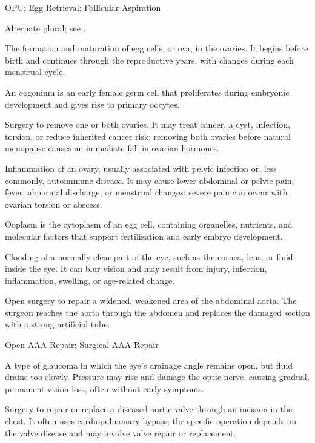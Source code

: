\synonyms
OPU; Egg Retrieval; Follicular Aspiration

 Alternate plural; see .

 The formation and maturation of egg cells, or ova, in the ovaries. It begins before birth and continues through the reproductive years, with changes during each menstrual cycle.

 An oogonium is an early female germ cell that proliferates during embryonic development and gives rise to primary oocytes.

 Surgery to remove one or both ovaries. It may treat cancer, a cyst, infection, torsion, or reduce inherited cancer risk; removing both ovaries before natural menopause causes an immediate fall in ovarian hormones.

 Inflammation of an ovary, usually associated with pelvic infection or, less commonly, autoimmune disease.
It may cause lower abdominal or pelvic pain, fever, abnormal discharge, or menstrual changes;
severe pain can occur with ovarian torsion or abscess.

 Ooplasm is the cytoplasm of an egg cell, containing organelles, nutrients, and molecular factors that support fertilization and early embryo development.

 Clouding of a normally clear part of the eye, such as the cornea, lens, or fluid inside the eye. It can blur vision and may result from injury, infection, inflammation, swelling, or age-related change.

 Open surgery to repair a widened, weakened area of the abdominal aorta. The surgeon reaches the aorta through the abdomen and replaces the damaged section with a strong artificial tube.

\synonyms
Open AAA Repair; Surgical AAA Repair

 A type of glaucoma in which the eye’s drainage angle remains open, but fluid drains too slowly. Pressure may rise and damage the optic nerve, causing gradual, permanent vision loss, often without early symptoms.

 Surgery to repair or replace a diseased aortic
valve through an incision in the chest. It often uses cardiopulmonary bypass; the
specific operation depends on the valve disease and may involve valve repair or
replacement.

